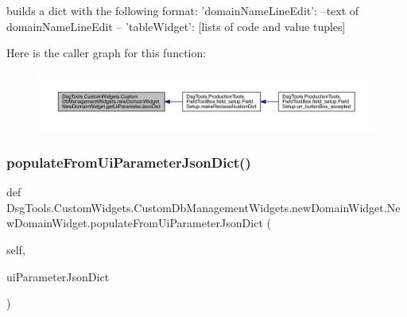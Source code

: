 \begin{DoxyVerb}builds a dict with the following format:
{
    'domainNameLineEdit': --text of domainNameLineEdit --
    'tableWidget': [lists of code and value tuples]
}
\end{DoxyVerb}
 Here is the caller graph for this function\+:
\nopagebreak
\begin{figure}[H]
\begin{center}
\leavevmode
\includegraphics[width=350pt]{class_dsg_tools_1_1_custom_widgets_1_1_custom_db_management_widgets_1_1new_domain_widget_1_1_new_domain_widget_a29cb2e35d43c2e88794b75ac6b21373e_icgraph}
\end{center}
\end{figure}
\mbox{\label{class_dsg_tools_1_1_custom_widgets_1_1_custom_db_management_widgets_1_1new_domain_widget_1_1_new_domain_widget_a79ada84e8570b7dd7bf7d3b7a33c3c0a}} 
\subsubsection{\texorpdfstring{populate\+From\+Ui\+Parameter\+Json\+Dict()}{populateFromUiParameterJsonDict()}}
{\footnotesize\ttfamily def Dsg\+Tools.\+Custom\+Widgets.\+Custom\+Db\+Management\+Widgets.\+new\+Domain\+Widget.\+New\+Domain\+Widget.\+populate\+From\+Ui\+Parameter\+Json\+Dict (\begin{DoxyParamCaption}\item[{}]{self,  }\item[{}]{ui\+Parameter\+Json\+Dict }\end{DoxyParamCaption})}

